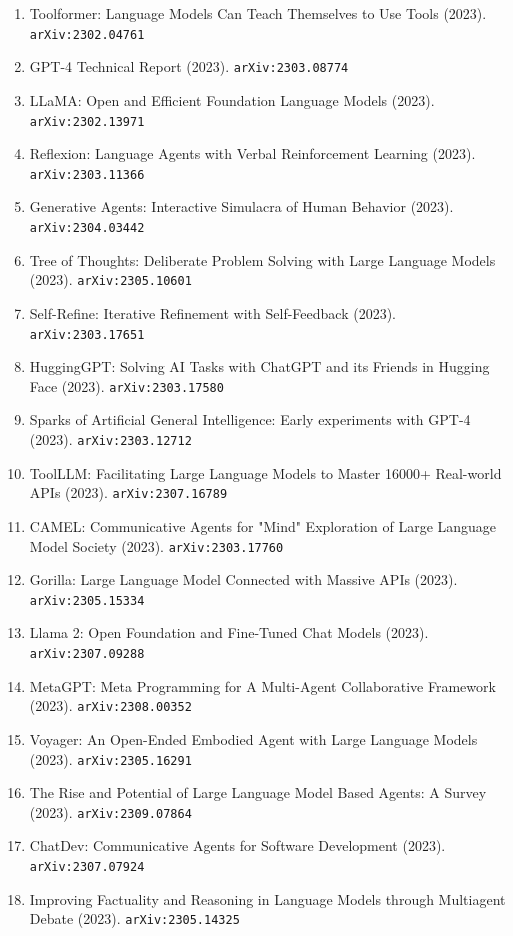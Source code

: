 \documentclass[11pt]{article}
\begin{document}
\begin{enumerate}
  \item Toolformer: Language Models Can Teach Themselves to Use Tools (2023). \texttt{arXiv:2302.04761}
  \item GPT-4 Technical Report (2023). \texttt{arXiv:2303.08774}
  \item LLaMA: Open and Efficient Foundation Language Models (2023). \texttt{arXiv:2302.13971}
  \item Reflexion: Language Agents with Verbal Reinforcement Learning (2023). \texttt{arXiv:2303.11366}
  \item Generative Agents: Interactive Simulacra of Human Behavior (2023). \texttt{arXiv:2304.03442}
  \item Tree of Thoughts: Deliberate Problem Solving with Large Language Models (2023). \texttt{arXiv:2305.10601}
  \item Self-Refine: Iterative Refinement with Self-Feedback (2023). \texttt{arXiv:2303.17651}
  \item HuggingGPT: Solving AI Tasks with ChatGPT and its Friends in Hugging
  Face (2023). \texttt{arXiv:2303.17580}
  \item Sparks of Artificial General Intelligence: Early experiments with GPT-4 (2023). \texttt{arXiv:2303.12712}
  \item ToolLLM: Facilitating Large Language Models to Master 16000+ Real-world
  APIs (2023). \texttt{arXiv:2307.16789}
  \item CAMEL: Communicative Agents for "Mind" Exploration of Large Language
  Model Society (2023). \texttt{arXiv:2303.17760}
  \item Gorilla: Large Language Model Connected with Massive APIs (2023). \texttt{arXiv:2305.15334}
  \item Llama 2: Open Foundation and Fine-Tuned Chat Models (2023). \texttt{arXiv:2307.09288}
  \item MetaGPT: Meta Programming for A Multi-Agent Collaborative Framework (2023). \texttt{arXiv:2308.00352}
  \item Voyager: An Open-Ended Embodied Agent with Large Language Models (2023). \texttt{arXiv:2305.16291}
  \item The Rise and Potential of Large Language Model Based Agents: A Survey (2023). \texttt{arXiv:2309.07864}
  \item ChatDev: Communicative Agents for Software Development (2023). \texttt{arXiv:2307.07924}
  \item Improving Factuality and Reasoning in Language Models through Multiagent
  Debate (2023). \texttt{arXiv:2305.14325}

\end{enumerate}
\end{document}
